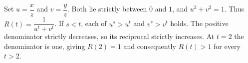Set $u=\dfrac{x}{z}$ and $v=\dfrac{y}{z}$. Both lie strictly between $0$ and $1$, and $u^2+v^2=1$. Thus $R(t)=\dfrac{1}{u^t+v^t}$. If $s<t$, each of $u^s>u^t$ and $v^s>v^t$ holds. The positive denominator strictly decreases, so its reciprocal strictly increases. At $t=2$ the denominator is one, giving $R(2)=1$ and consequently $R(t)>1$ for every $t>2$.
